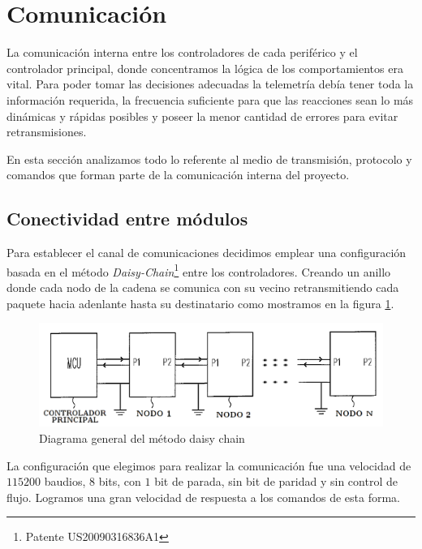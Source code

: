 \section{Comunicaci\'on}
\label{h_comm}

La comunicaci\'on interna entre los controladores de cada perif\'erico y el controlador principal, donde concentramos
la l\'ogica de los comportamientos era vital.
Para poder tomar las decisiones adecuadas la telemetr\'ia deb\'ia tener toda la informaci\'on requerida, la frecuencia
suficiente para que las reacciones sean lo m\'as din\'amicas y r\'apidas posibles y poseer la menor cantidad de errores
para evitar retransmisiones.

En esta secci\'on analizamos todo lo referente al medio de transmisi\'on, protocolo y comandos que forman parte de la
comunicaci\'on interna del proyecto.

\subsection{Conectividad entre m\'odulos}
\label{h_comm_conectividad}

Para establecer el canal de comunicaciones decidimos emplear una configuraci\'on basada en el m\'etodo 
\emph{Daisy-Chain}\footnote{Patente US20090316836A1} entre los controladores.
Creando un anillo donde cada nodo de la cadena se comunica con su vecino retransmitiendo cada paquete hacia adenlante 
hasta su destinatario como mostramos en la figura \ref{hF_comm_daisychain}.

\begin{figure}[ht]
	\centering
	\includegraphics[scale=.40]{daisychain_diagram.png}
	\caption{Diagrama general del m\'etodo daisy chain}
	\label{hF_comm_daisychain}
\end{figure}

La configuraci\'on que elegimos para realizar la comunicaci\'on fue una velocidad de $115200$ baudios, $8$ bits, con $1$ bit de parada,
sin bit de paridad y sin control de flujo.
Logramos una gran velocidad de respuesta a los comandos de esta forma.

